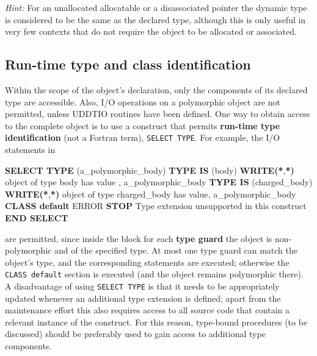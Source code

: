 \documentclass[
  paper=a4,
  ,captions=tableheading
]{scrartcl}
\newenvironment{Shaded}{\begin{snugshade}}{\end{snugshade}}
\newcommand{\FunctionTok}[1]{\textcolor[rgb]{0.13,0.29,0.53}{\textbf{#1}}}
\newcommand{\KeywordTok}[1]{\textcolor[rgb]{0.13,0.29,0.53}{\textbf{#1}}}
\newcommand{\NormalTok}[1]{#1}
\newcommand{\StringTok}[1]{\textcolor[rgb]{0.31,0.60,0.02}{#1}}
\begin{document}
\emph{Hint:} For an unallocated allocatable or a disassociated pointer
the dynamic type is considered to be the same as the declared type,
although this is only useful in very few contexts that do not require
the object to be allocated or associated.

\subsection{Run-time type and class
identification}\label{run-time-type-and-class-identification}

Within the scope of the object's declaration, only the components of its
declared type are accessible. Also, I/O operations on a polymorphic
object are not permitted, unless UDDTIO routines have been defined. One
way to obtain access to the complete object is to use a construct that
permits \textbf{run-time type identification} (not a Fortran term),
\texttt{SELECT\ TYPE}. For example, the I/O statements in

\begin{Shaded}
\begin{Highlighting}[]
\KeywordTok{SELECT TYPE}\NormalTok{ (a\_polymorphic\_body)}
\KeywordTok{TYPE IS}\NormalTok{ (body)}
   \FunctionTok{WRITE(*}\NormalTok{,}\FunctionTok{*)} \StringTok{\textquotesingle{}object of type body has value        \textquotesingle{}}\NormalTok{, a\_polymorphic\_body}
\KeywordTok{TYPE IS}\NormalTok{ (charged\_body)}
   \FunctionTok{WRITE(*}\NormalTok{,}\FunctionTok{*)} \StringTok{\textquotesingle{}object of type charged\_body has value\textquotesingle{}}\NormalTok{, a\_polymorphic\_body}
\KeywordTok{CLASS default}
\NormalTok{   ERROR }\KeywordTok{STOP} \StringTok{\textquotesingle{}Type extension unsupported in this construct\textquotesingle{}}
\KeywordTok{END SELECT}
\end{Highlighting}
\end{Shaded}

are permitted, since inside the block for each \textbf{type guard} the
object is non-polymorphic and of the specified type. At most one type
guard can match the object's type, and the corresponding statements are
executed; otherwise the \texttt{CLASS\ default} section is executed (and
the object remains polymorphic there). A disadvantage of using
\texttt{SELECT\ TYPE} is that it needs to be appropriately updated
whenever an additional type extension is defined; apart from the
maintenance effort this also requires access to all source code that
contain a relevant instance of the construct. For this reason,
type-bound procedures (to be discussed) should be preferably used to
gain access to additional type components.
\end{document}
